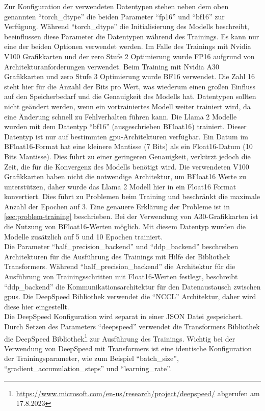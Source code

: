 Zur Konfiguration der verwendeten Datentypen stehen neben dem oben genannten \enquote{torch\_dtype} die beiden Parameter \enquote{fp16} und \enquote{bf16} zur Verfügung. Während \enquote{torch\_dtype} die Initialisierung des Modells beschreibt, beeinflussen diese Parameter die Datentypen während des Trainings.
Es kann nur eine der beiden Optionen verwendet werden. Im Falle des Trainings mit Nvidia V100 Grafikkarten und der \ac{zero} Stufe 2 Optimierung wurde FP16 aufgrund von Architekturanforderungen verwendet. Beim Training mit Nvidia A30 Grafikkarten und \ac{zero} Stufe 3 Optimierung wurde BF16 verwendet.
Die Zahl 16 steht hier für die Anzahl der Bits pro Wert, was wiederum einen großen Einfluss auf den Speicherbedarf und die Genauigkeit des Modells hat.
Datentypen sollten nicht geändert werden, wenn ein vortrainiertes Modell weiter trainiert wird, da eine Änderung schnell zu Fehlverhalten führen kann.
Die Llama 2 Modelle wurden mit dem Datentyp \enquote{bf16} (ausgeschrieben BFloat16) trainiert.
Dieser Datentyp ist nur auf bestimmten \ac{gpu}-Architekturen verfügbar.
Ein Datum im BFloat16-Format hat eine kleinere Mantisse (7 Bits) als ein Float16-Datum (10 Bits Mantisse). Dies führt zu einer geringeren Genauigkeit, verkürzt jedoch die Zeit, die für die Konvergenz des Modells benötigt wird.
Die verwendeten V100 Grafikkarten haben nicht die notwendige Architektur, um BFloat16 Werte zu unterstützen, daher wurde das Llama 2 Modell hier in ein Float16 Format konvertiert.
Dies führt zu Problemen beim Training und beschränkt die maximale Anzahl der Epochen auf 3. Eine genauere Erklärung der Probleme ist in \cref{sec:problem-training} beschrieben.
Bei der Verwendung von A30-Grafikkarten ist die Nutzung von BFloat16-Werten möglich. Mit diesem Datentyp wurden die Modelle zusätzlich auf 5 und 10 Epochen trainiert.\\

Die Parameter \enquote{half\_precision\_backend} und \enquote{ddp\_backend} beschreiben Architekturen für die Ausführung des Trainings mit Hilfe der Bibliothek Transformers.
Während \enquote{half\_precision\_backend} die Architektur für die Ausführung von Trainingsschritten mit Float16-Werten festlegt, beschreibt \enquote{ddp\_backend} die Kommunikationsarchitektur für den Datenaustausch zwischen \ac{gpu}s.
Die DeepSpeed Bibliothek verwendet die \enquote{NCCL} Architektur, daher wird diese hier eingestellt.\\

Die DeepSpeed Konfiguration wird separat in einer JSON Datei gespeichert.
Durch Setzen des Parameters \enquote{deepspeed} verwendet die Transformers Bibliothek die DeepSpeed Bibliothek\footnote{\url{https://www.microsoft.com/en-us/research/project/deepspeed/} abgerufen am 17.8.2023} zur Ausführung des Trainings.
Wichtig bei der Verwendung von DeepSpeed mit Transformers ist eine identische Konfiguration der Trainingsparameter, wie zum Beispiel \enquote{batch\_size}, \enquote{gradient\_accumulation\_steps} und \enquote{learning\_rate}.\\

